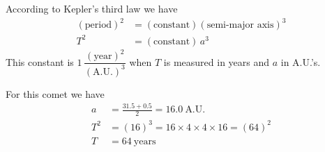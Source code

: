 According to Kepler's third law we have
\begin{align*}
  (\text{period})^2 &= (\text{constant})(\text{semi-major axis})^3 \\
  T^2 &= (\text{constant})\,a^3
\end{align*}
This constant is $1\,\dfrac{(\text{year})^2}{(\text{A.U.})^3}$ when $T$ is
measured in years and $a$ in A.U.'s.

For this comet we have
\begin{align*}
  a &= \frac{31.5 + 0.5}{2} = 16.0\ \text{A.U.} \\
  T^2 &= (16)^3 = 16 \times 4 \times 4 \times 16 = (64)^2 \\
  T &= 64\ \text{years}
\end{align*}
